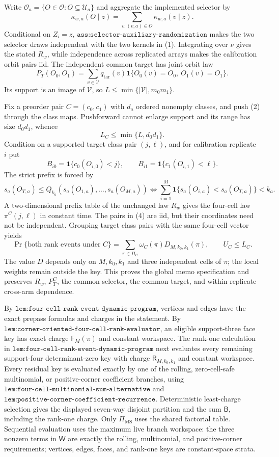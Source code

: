 Write
\(\mathcal O_a=\{O\in\mathcal O:O\subseteq\mathcal U_a\}\) and aggregate the implemented selector by
\[
\kappa_{w,a}(O\mid z)=
\sum_{v:(v,a)\in O}\kappa_{w,a}(v\mid z).
\tag{1}
\]
Conditional on \(Z_i=z\), \(\texttt{ass:selector-auxiliary-randomization}\) makes the two selector draws independent with the two kernels in (1). Integrating over \(\nu\) gives the stated \(R_w\), while independence across replicated arrays makes the calibration orbit pairs iid. The independent common target has joint orbit law
\[
P_T(O_0,O_1)=\sum_{v\in\mathcal V}q_{\mathrm{tar}}(v)
\mathbf 1\{O_0(v)=O_0,\ O_1(v)=O_1\}.
\tag{2}
\]
Its support is an image of \(\mathcal V\), so
\(L\le\min\{|\mathcal V|,m_0m_1\}\).

Fix a preorder pair \(C=(c_0,c_1)\) with \(d_a\) ordered nonempty classes, and push (2) through the class maps. Pushforward cannot enlarge support and its range has size \(d_0d_1\), whence
\[
L_C\le\min\{L,d_0d_1\}.
\tag{3}
\]
Condition on a supported target class pair \((j,\ell)\), and for calibration replicate \(i\) put
\[
B_{i0}=\mathbf 1\{c_0(O_{i,0})<j\},\qquad
B_{i1}=\mathbf 1\{c_1(O_{i,1})<\ell\}.
\tag{4}
\]
The strict prefix is forced by
\[
s_a(O_{T,a})\le Q_{k_a}(s_a(O_{1,a}),\ldots,s_a(O_{M,a}))
\iff
\sum_{i=1}^M\mathbf 1\{s_a(O_{i,a})<s_a(O_{T,a})\}<k_a.
\tag{5}
\]
A two-dimensional prefix table of the unchanged law \(R_w\) gives the four-cell law \(\pi^C(j,\ell)\) in constant time. The pairs in (4) are iid, but their coordinates need not be independent. Grouping target class pairs with the same four-cell vector yields
\[
\Pr\{\text{both rank events under }C\}
=\sum_{\pi\in\Pi_C}\omega_C(\pi)D_{M,k_0,k_1}(\pi),
\qquad U_C\le L_C.
\tag{6}
\]
The value \(D\) depends only on \(M,k_0,k_1\) and three independent cells of \(\pi\); the local weights remain outside the key. This proves the global memo specification and preserves \(R_w\), \(P_T^C\), the common selector, the common target, and within-replicate cross-arm dependence.

By \(\texttt{lem:four-cell-rank-event-dynamic-program}\), vertices and edges have the exact prepass formulas and charges in the statement. By
\(\texttt{lem:corner-oriented-four-cell-rank-evaluator}\), an eligible support-three face key has exact charge \(\mathsf F_M(\pi)\) and constant workspace. The rank-one calculation in \(\texttt{lem:four-cell-rank-event-dynamic-program}\) next evaluates every remaining support-four determinant-zero key with charge \(\mathsf R_{M,k_0,k_1}\) and constant workspace. Every residual key is evaluated exactly by one of the rolling,
zero-cell-safe multinomial, or positive-corner coefficient branches, using
\(\texttt{lem:four-cell-multinomial-sum-alternative}\) and
\(\texttt{lem:positive-corner-coefficient-recurrence}\). Deterministic least-charge selection gives the displayed seven-way disjoint partition and the sum \(\mathsf B\), including the rank-one charge. Only \(\Pi_{\mathrm{MS}}\) uses the shared factorial table. Sequential evaluation uses the maximum live branch workspace: the three nonzero terms in \(\mathsf W\) are exactly the rolling, multinomial, and positive-corner requirements; vertices, edges, faces, and rank-one keys are constant-space strata.

